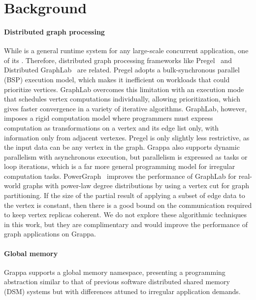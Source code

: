 \section{Background}



\paragraph{Distributed graph processing} While \Grappa is a general runtime
system for any large-scale concurrent application, one of its . Therefore, distributed graph processing
frameworks like Pregel~\cite{pregel:2010} and Distributed
GraphLab~\cite{distgraphlab:vldb12} are related. Pregel adopts a
bulk-synchronous parallel (BSP) execution model, which makes it inefficient on
workloads that could prioritize vertices. GraphLab overcomes this limitation with an execution mode
that schedules vertex computations individually, allowing prioritization, which
gives faster convergence in a variety of iterative algorithms. GraphLab,
however, imposes a rigid computation model where programmers must express
computation as transformations on a vertex and its edge list only, with
information only from adjacent vertexes. Pregel is only slightly less
restrictive, as the input data can be any vertex in the graph. Grappa also
supports dynamic parallelism with asynchronous execution, but parallelism is
expressed as tasks or loop iterations, which is a far more general programming
model for irregular computation tasks. PowerGraph~\cite{powergraph:osdi12} improves
the performance of GraphLab for real-world graphs with power-law degree distributions by
using a vertex cut for graph partitioning. If the size of the partial result of 
applying a subset of edge data to the vertex is constant, then there is a good bound on the communication
required to keep vertex replicas coherent. We do not explore these algorithmic techniques
in this work, but they are complimentary and would improve the performance of graph applications on Grappa.

\paragraph{Global memory} Grappa supports a global memory namespace, presenting a programming abstraction similar to that of previous software distributed shared memory (DSM) systems but with differences attuned to irregular application demands.


